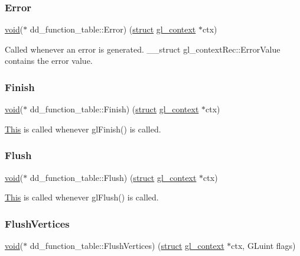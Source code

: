 \subsubsection{\texorpdfstring{Error}{Error}}
{\footnotesize\ttfamily \hyperlink{interfacevoid}{void}($\ast$ dd\+\_\+function\+\_\+table\+::\+Error) (\hyperlink{interfacestruct}{struct} \hyperlink{structgl__context}{gl\+\_\+context} $\ast$ctx)}

Called whenever an error is generated. \+\_\+\+\_\+struct gl\+\_\+context\+Rec\+::\+Error\+Value contains the error value. \mbox{\label{structdd__function__table_a3d15abc006c0aa92f1b467cd29d8e2b4}} 
\subsubsection{\texorpdfstring{Finish}{Finish}}
{\footnotesize\ttfamily \hyperlink{interfacevoid}{void}($\ast$ dd\+\_\+function\+\_\+table\+::\+Finish) (\hyperlink{interfacestruct}{struct} \hyperlink{structgl__context}{gl\+\_\+context} $\ast$ctx)}

\hyperlink{namespace_this}{This} is called whenever gl\+Finish() is called. \mbox{\label{structdd__function__table_a0680f8de4e049f72cfb10cf5867a85f5}} 
\subsubsection{\texorpdfstring{Flush}{Flush}}
{\footnotesize\ttfamily \hyperlink{interfacevoid}{void}($\ast$ dd\+\_\+function\+\_\+table\+::\+Flush) (\hyperlink{interfacestruct}{struct} \hyperlink{structgl__context}{gl\+\_\+context} $\ast$ctx)}

\hyperlink{namespace_this}{This} is called whenever gl\+Flush() is called. \mbox{\label{structdd__function__table_a3c743494ace4641ddbd61b3168fe7f96}} 
\subsubsection{\texorpdfstring{Flush\+Vertices}{FlushVertices}}
{\footnotesize\ttfamily \hyperlink{interfacevoid}{void}($\ast$ dd\+\_\+function\+\_\+table\+::\+Flush\+Vertices) (\hyperlink{interfacestruct}{struct} \hyperlink{structgl__context}{gl\+\_\+context} $\ast$ctx, G\+Luint flags)}

